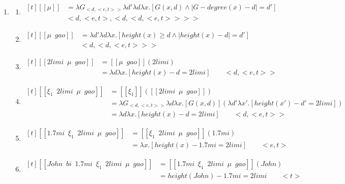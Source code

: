 \documentclass{ctexart}
\begin{document}
\begin{enumerate}
    \item \label{maomao17}
    \begin{enumerate}
        \item \label{maomao17_b}
        $\begin{aligned}[t]
            [\![\mu]\!] &= \lambda G_{<d,<e,t>>} \lambda d' \lambda d \lambda x.[G(x,d) \land | G-degree(x) - d | = d'] \\
            & <d,<e,t>,<d,<d,<e,t>>>>
        \end{aligned}$
        
        \item \label{maomao17_c}
        $\begin{aligned}[t]
            [\![\mu \enspace gao]\!] &= \lambda d' \lambda d \lambda x.[height(x) \geq d \land |height(x) - d|=d'] \\
            & <d,<d,<e,t>>>
        \end{aligned}$

        \item \label{maomao17_d}
        $\begin{aligned}[t]
            [\![2limi \enspace \mu \enspace gao]\!] &= [\![\mu \enspace gao]\!](2limi) \\
            &= \lambda d \lambda x. [height(x) - d = 2 limi] \qquad <d,<e,t>>
        \end{aligned}$

        \item \label{maomao17_e}
        $\begin{aligned}[t]
            [\![\xi_1 \enspace 2limi \enspace \mu \enspace gao]\!] &= [\![\xi_1]\!]([\![2limi \enspace \mu \enspace gao]\!]) \\
            &= \lambda G_{<d,<e,t>>} \lambda d \lambda x. [G(x,d)](\lambda d' \lambda x'. [height(x') - d' = 2 limi])\\
            &= \lambda d \lambda x. [height(x)-d=2limi] \qquad <d,<e,t>>
        \end{aligned}$

        \item \label{maomao17_f}
        $\begin{aligned}[t]
            [\![1.7mi \enspace \xi_1 \enspace 2limi \enspace \mu \enspace gao]\!] &= [\![\xi_1 \enspace 2limi \enspace \mu \enspace gao]\!](1.7mi) \\
            &=\lambda x.[height(x) -1.7mi=2limi] \qquad <e,t>
        \end{aligned}$

        \item \label{maomao17_g}
        $\begin{aligned}[t]
            [\![John \enspace bi \enspace 1.7mi \enspace \xi_1 \enspace 2limi \enspace \mu \enspace gao]\!] &= [\![1.7mi \enspace \xi_1 \enspace 2limi \enspace \mu \enspace gao]\!](John) \\
            &=height(John) -1.7mi=2limi \qquad <t>
        \end{aligned}$

    \end{enumerate}
\end{enumerate}
\end{document}
